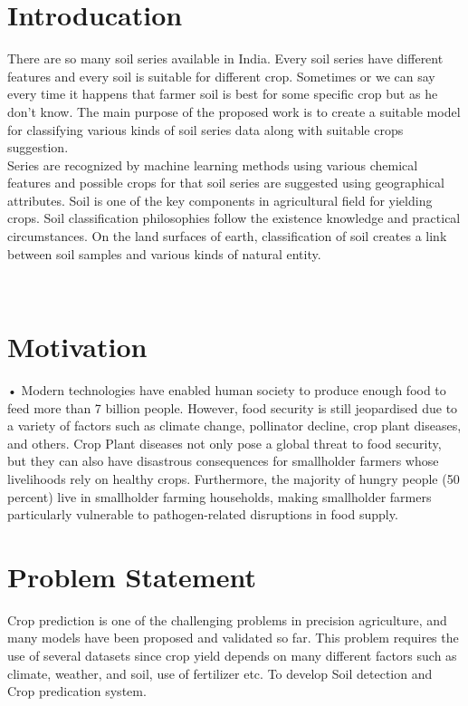 \documentclass[oneside,a4paper,12pt]{report}
\begin{document}
\section {Introducation}
 There are so many soil series available in India. Every soil series have different features and every soil is suitable for different crop. Sometimes or we can say every time it happens that farmer soil is best for some specific crop but as he don’t know. The main purpose of the proposed work is to create a suitable model for classifying various kinds of soil series data along with suitable crops suggestion.\\ 
Series are recognized by machine learning methods using various chemical features and possible crops for that soil series are suggested using geographical attributes. Soil is one of the key components in agricultural field for yielding crops. Soil classification philosophies follow the existence knowledge and practical circumstances. On the land surfaces of earth, classification of soil creates a link between soil samples and various kinds of natural entity.

 \\

\section{Motivation}
\label{sec:problem}
\item •	Modern technologies have enabled human society to produce enough food to feed more than 7 billion people. However, food security is still jeopardised due to a variety of factors such as climate change, pollinator decline, crop plant diseases, and others. Crop Plant diseases not only pose a global threat to food security, but they can also have disastrous consequences for smallholder farmers whose livelihoods rely on healthy crops. Furthermore, the majority of hungry people (50 percent) live in smallholder farming households, making smallholder farmers particularly vulnerable to pathogen-related disruptions in food supply.\\
\section{Problem Statement}
\label{sec:problem}

\item Crop  prediction is one of the challenging problems in precision agriculture, and many models have been proposed and validated so far.
 This problem requires the use of several datasets since crop yield depends on many different factors such as climate, weather, and soil, use of fertilizer etc. To develop Soil detection and Crop predication system.
\end{document}
